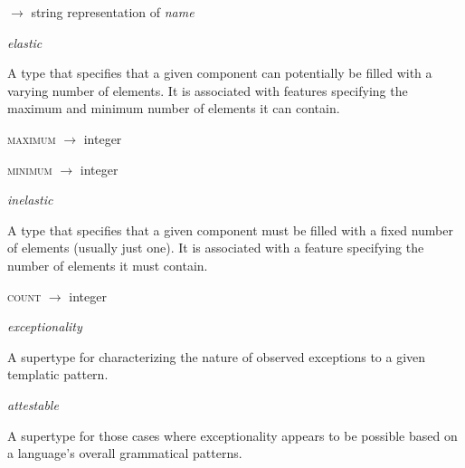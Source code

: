 \begin{ontologytop}
	\begin{proplist}

	\item \textsc{\name} $\rightarrow$ string representation of \emph{name}

	\end{proplist}

	\begin{classlist}

	\item \emph{elastic}
	\hspace{1em}\parbox[t]{\linegoal}{\footnotesize A type that specifies that a given component can potentially be filled with a varying number of elements. It is associated with features specifying the maximum and minimum number of elements it can contain.}


		\begin{proplist}

		\item \textsc{maximum} $\rightarrow$ {integer} \emph{}

		\item \textsc{minimum} $\rightarrow$ {integer} \emph{}

		\end{proplist}

	\item \emph{inelastic}
	\hspace{1em}\parbox[t]{\linegoal}{\footnotesize A type that specifies that a given component must be filled with a fixed number of elements (usually just one). It is associated with a feature specifying the number of elements it must contain.}


		\begin{proplist}

		\item \textsc{count} $\rightarrow$ {integer} \emph{}

		\end{proplist}

	\end{classlist}

\item \emph{exceptionality}
\hspace{1em}\parbox[t]{\linegoal}{\footnotesize A supertype for characterizing the nature of observed exceptions to a given templatic pattern.}


	\begin{classlist}

	\item \emph{attestable}
	\hspace{1em}\parbox[t]{\linegoal}{\footnotesize A supertype for those cases where exceptionality appears to be possible based on a language's overall grammatical patterns.}



\end{classlist}
\end{ontologytop}
